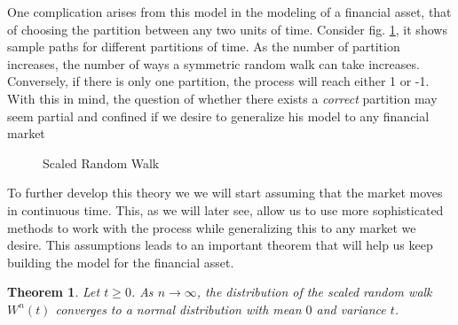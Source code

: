 \documentclass[11pt]{report}
\newtheorem{theorem}{Theorem}
\begin{document}
One complication arises from this model in the modeling of a financial asset, that of choosing the partition between any two units of time. Consider fig. \ref{scaled_random_walk}, it shows sample paths for different partitions of time. As the number of partition increases, the number of ways a symmetric random walk can take increases. Conversely, if there is only one partition, the process will reach either 1 or -1. With this in mind, the question of whether there exists a \textit{correct} partition may seem partial and confined if we desire to generalize his model to any financial market\\

\begin{figure}[h]
	\label{scaled_random_walk}
	\centering
	
	\caption{Scaled Random Walk}
\end{figure}


To further develop this theory we we will start assuming that the market moves in continuous time. This, as we will later see, allow us to use more sophisticated methods to work with the process while generalizing this to any market we desire. This assumptions leads to an important theorem that will help us keep building the model for the financial asset.

\begin{theorem}\label{th:convergence_rw}
	Let $t \geq 0$. As $n \to \infty$, the distribution of the scaled random walk $W^n(t)$ converges to a normal distribution with mean $0$ and variance $t$.
\end{theorem}
\end{document}
